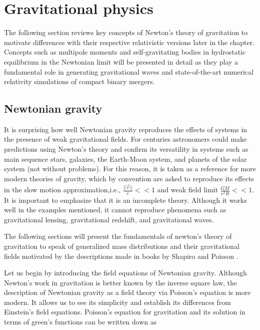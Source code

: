 \chapter{Gravitational physics}\label{gravphys}

The following section reviews key concepts of Newton’s theory of gravitation to motivate differences with their respective relativistic versions later in the chapter. Concepts such as multipole moments and self-gravitating bodies in hydrostatic equilibrium in the Newtonian limit will be presented in detail as they play a fundamental role in generating gravitational waves and state-of-the-art numerical relativity simulations of compact binary mergers. 


\section{Newtonian gravity}

It is surprising how well Newtonian gravity reproduces the effects of systems in the presence of weak gravitational fields. For centuries astronomers could make predictions using Newton's theory and confirm its versatility in systems such as main sequence stars, galaxies, the Earth-Moon system, and planets of the solar system (not without problems). For this reason, it is taken as a reference for more modern theories of gravity, which by convention are asked to reproduce its effects in the slow motion approximation,i.e., $\frac{||\vec{v}||}{c} << 1$ and weak field limit $\frac{GM}{c^2 R} <<1$. It is important to emphasize that it is an incomplete theory. Although it works well in the examples mentioned, it cannot reproduce phenomena such as gravitational lensing, gravitational redshift, and gravitational waves.


The following sections will present the fundamentals of newton's theory of gravitation to speak of generalized mass distributions and their gravitational fields motivated by the descriptions made in books by Shapiro\cite{Shapiro:1983du} and Poisson \cite{poisson_will_2014}.

Let us begin by introducing the field equations of Newtonian gravity. Although Newton's work in gravitation is better known by the inverse square law, the description of Newtonian gravity as a field theory via Poisson's equation is more modern. It allows us to see its simplicity and establish its differences from Einstein's field equations. Poisson's equation for gravitation and its solution in terms of green's functions can be written down as 

